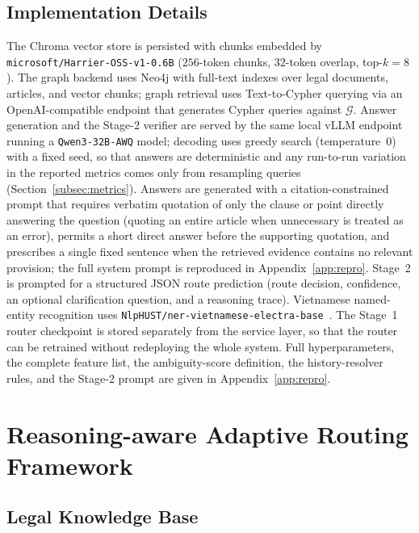 \documentclass[pdflatex,sn-mathphys-num]{sn-jnl}
\begin{document}
\subsection{Implementation Details}\label{subsec:implementation}

The Chroma vector store is persisted with chunks embedded by
\texttt{microsoft/Harrier-OSS-v1-0.6B} ($256$-token chunks, $32$-token
overlap, top-$k=8$). The graph backend uses Neo4j with full-text indexes over
legal documents, articles, and vector chunks; graph retrieval uses
Text-to-Cypher querying via an OpenAI-compatible endpoint that generates
Cypher queries against $\mathcal{G}$. Answer generation and the Stage-2
verifier are served by the same local vLLM endpoint running a
\texttt{Qwen3-32B-AWQ} model; decoding uses greedy search (temperature~$0$)
with a fixed seed, so that answers are deterministic and any run-to-run
variation in the reported metrics comes only from resampling queries
(Section~\ref{subsec:metrics}).
Answers are generated with a citation-constrained prompt that
requires verbatim quotation of only the clause or point directly answering
the question (quoting an entire article when unnecessary is treated as an
error), permits a short direct answer before the supporting quotation, and
prescribes a single fixed sentence when the retrieved evidence contains no
relevant provision; the full system prompt is reproduced in
Appendix~\ref{app:repro}. Stage~2 is prompted for a structured JSON route
prediction (route decision, confidence, an optional clarification question,
and a reasoning trace).
Vietnamese named-entity recognition uses
\texttt{NlpHUST/ner-vietnamese-electra-base}~\cite{clark2020electra}. The
Stage~1 router checkpoint is stored separately from the service layer, so
that the router can be retrained without redeploying the whole system. Full
hyperparameters, the complete feature list, the ambiguity-score definition,
the history-resolver rules, and the Stage-2 prompt are given in
Appendix~\ref{app:repro}.

\section{Reasoning-aware Adaptive Routing Framework}\label{sec:routing_framework}

\subsection{Legal Knowledge Base}\label{subsec:legal_kb}
\end{document}
